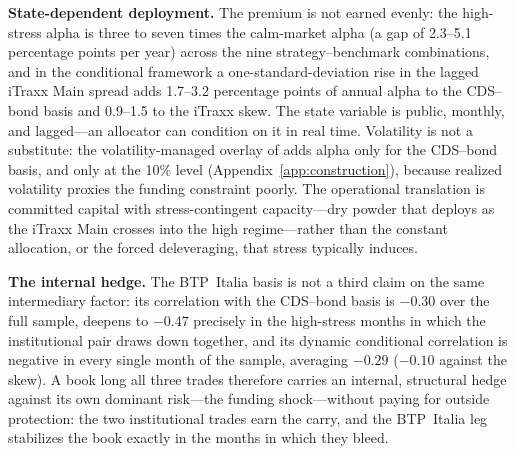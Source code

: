 
\textbf{State-dependent deployment.} The premium
is not earned evenly: the high-stress alpha is three to seven times the calm-market alpha (a gap of 2.3--5.1 percentage points per year)
across the nine strategy--benchmark combinations, and in the
conditional framework a one-standard-deviation rise in the lagged iTraxx Main
spread adds 1.7--3.2 percentage points of annual alpha to the CDS--bond basis
and 0.9--1.5 to the iTraxx skew. The state variable is public, monthly, and
lagged---an allocator can condition on it in real time. Volatility is not a
substitute: the volatility-managed overlay of \citet{moreira2017volatility}
adds alpha only for the CDS--bond basis, and only at the 10\% level
(Appendix~\ref{app:construction}), because realized volatility proxies the
funding constraint poorly.
The operational translation is committed capital with stress-contingent
capacity---dry powder that deploys as the iTraxx Main crosses into the high
regime---rather than the constant allocation, or the forced deleveraging, that
stress typically induces.

\textbf{The internal hedge.} The BTP~Italia basis is
not a third claim on the same intermediary factor: its correlation with the
CDS--bond basis is $-0.30$ over the full sample, deepens to $-0.47$ precisely
in the high-stress months in which the institutional pair draws down together,
and its dynamic conditional correlation is negative in every single month of
the sample, averaging $-0.29$ ($-0.10$ against the skew).
A book long all three trades therefore carries an internal, structural hedge
against its own dominant risk---the funding shock---without paying for outside
protection: the two institutional trades earn the carry, and the BTP~Italia
leg stabilizes the book exactly in the months in which they bleed.


